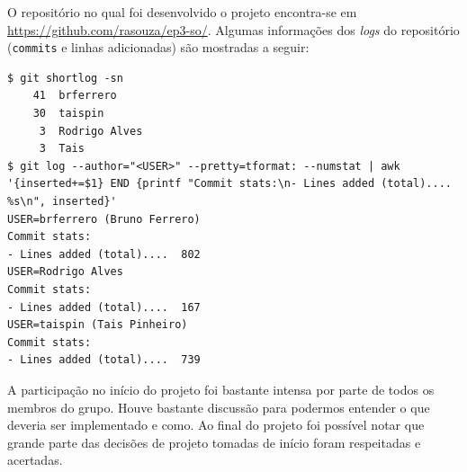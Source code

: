 \documentclass[12pt,a4paper]{article}
\begin{document}
O repositório no qual foi desenvolvido o projeto encontra-se em \url{https://github.com/rasouza/ep3-so/}. Algumas informações dos \textit{logs} do repositório (\texttt{commits} e linhas adicionadas) são mostradas a seguir:

\begin{lstlisting}
$ git shortlog -sn
    41  brferrero
    30  taispin
     3  Rodrigo Alves
     3  Tais
$ git log --author="<USER>" --pretty=tformat: --numstat | awk '{inserted+=$1} END {printf "Commit stats:\n- Lines added (total)....  %s\n", inserted}'
USER=brferrero (Bruno Ferrero)
Commit stats:
- Lines added (total)....  802
USER=Rodrigo Alves
Commit stats:
- Lines added (total)....  167
USER=taispin (Tais Pinheiro)
Commit stats:
- Lines added (total)....  739
\end{lstlisting}

A participação no início do projeto foi bastante intensa por parte de todos os membros do grupo. Houve bastante discussão para podermos entender o que deveria ser implementado e como. Ao final do projeto foi possível notar que grande parte das decisões de projeto tomadas de início foram respeitadas e acertadas.



\end{document}
